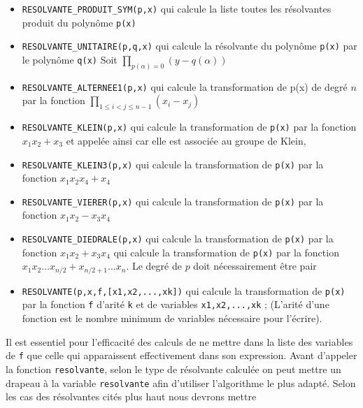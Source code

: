 \begin{itemize}
\item {\tt RESOLVANTE\_PRODUIT\_SYM(p,x)} 
 qui calcule la liste toutes les 
r\'esolvantes produit du polyn\^ome {\tt p(x)}
\item {\tt RESOLVANTE\_UNITAIRE(p,q,x)} 
qui calcule la r\'esolvante du 
polyn\^ome {\tt p(x)} par le polyn\^ome {\tt q(x)}
Soit $\prod_{p(\alpha)=0}(y-q(\alpha))$
\item {\tt RESOLVANTE\_ALTERNEE1(p,x)} 
qui calcule la transformation de 
p(x) de degr\'e $n$ par la fonction $\prod_{1\leq i<j\leq n-1} (x_i-x_j)$
\item {\tt RESOLVANTE\_KLEIN(p,x)} 
qui calcule la transformation de
{\tt p(x)} par la fonction $x_1x_2+x_3$ et appel\'ee ainsi car elle
est associ\'ee au groupe de Klein,
\item {\tt RESOLVANTE\_KLEIN3(p,x)} qui calcule la transformation de
{\tt p(x)} par la fonction $x_1x_2x_4+x_4$
\item {\tt RESOLVANTE\_VIERER(p,x)} 
qui calcule la transformation de
{\tt p(x)} par la fonction $x_1x_2-x_3x_4$
\item {\tt RESOLVANTE\_DIEDRALE(p,x)} 
qui calcule la transformation de
{\tt p(x)} par la fonction $x_1x_2+x_3x_4$
  qui calcule la transformation de
{\tt p(x)} par la fonction $x_1x_2\ldots x_{n/2}+x_{n/2+1}\ldots x_n$.
Le degr\'e de $p$ doit n\'ecessairement \^etre pair
\item {\tt RESOLVANTE(p,x,f,[x1,x2,...,xk])} 
qui calcule la transformation de
{\tt p(x)} par la fonction {\tt f} d'arit\'e {\tt k} et de variables 
{\tt x1,x2,...,xk} ; (L'arit\'e d'une fonction est le nombre minimum de 
variables n\'ecessaire pour l'\'ecrire).


\end{itemize}
Il est essentiel pour
l'efficacit\'e des calculs de ne mettre dans la liste des variables de
{\tt f} que celle qui apparaissent effectivement dans son expression.
Avant d'appeler la fonction {\tt resolvante}, selon le type de
r\'esolvante calcul\'ee on peut mettre un drapeau \`a la
variable {\tt resolvante}
afin d'utiliser l'algorithme le plus adapt\'e.
Selon les cas des r\'esolvantes cit\'es plus haut nous devrons mettre
